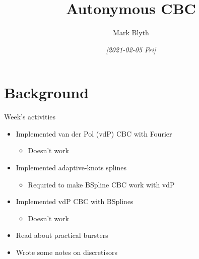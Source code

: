 \documentclass[presentation]{beamer}
\author{Mark Blyth}
\date{\textit{[2021-02-05 Fri]}}
\title{Autonymous CBC}
\begin{document}
\maketitle

\section{Background}
\label{sec:orgee8d360}
\begin{frame}[label={sec:org2644f96}]{Week's activities}
\begin{itemize}
\item Implemented van der Pol (vdP) CBC with Fourier
\begin{itemize}
\item Doesn't work
\end{itemize}
\end{itemize}
\vfill
\begin{itemize}
\item Implemented adaptive-knots splines
\begin{itemize}
\item Requried to make BSpline CBC work with vdP
\end{itemize}
\end{itemize}
\vfill
\begin{itemize}
\item Implemented vdP CBC with BSplines
\begin{itemize}
\item Doesn't work
\end{itemize}
\end{itemize}
\vfill
\begin{itemize}
\item Read about practical bursters
\end{itemize}
\vfill
\begin{itemize}
\item Wrote some notes on discretisors
\end{itemize}
\end{frame}
\end{document}
